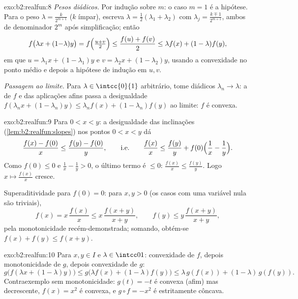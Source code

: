 \begin{solution}{exo:b2:realfun:8}
\emph{Pesos diádicos.} Por indução sobre $m$: o caso $m = 1$ é a
hipótese. Para o peso $\lambda = \frac{k}{2^{m+1}}$ ($k$ ímpar),
escreva $\lambda = \frac12(\lambda_1 + \lambda_2)$ com $\lambda_j =
\frac{k \mp 1}{2^{m+1}}$, ambos de denominador $2^m$ após
simplificação; então
\[
f\bigl(\lambda x + (1{-}\lambda)y\bigr)
= f\Bigl(\tfrac{u + v}{2}\Bigr)
\leq \frac{f(u) + f(v)}{2}
\leq \lambda f(x) + (1 - \lambda) f(y),
\]
em que $u = \lambda_1 x + (1 - \lambda_1)y$ e $v = \lambda_2 x +
(1-\lambda_2)y$, usando a convexidade no ponto médio e depois a hipótese
de indução em $u, v$.

\emph{Passagem ao limite.} Para $\lambda \in
\intcc{0}{1}$ arbitrário, tome diádicos $\lambda_n \to \lambda$: a  de
$f$ e das aplicações afins passa a desigualdade
$f(\lambda_n x + (1-\lambda_n)y) \leq \lambda_n f(x) +
(1-\lambda_n)f(y)$ ao limite: $f$ é convexa.
\end{solution}

\begin{solution}{exo:b2:realfun:9}
Para $0 < x < y$: a desigualdade das inclinações
(\cref{lem:b2:realfun:slopes}) nos pontos $0 < x < y$ dá
\[
\frac{f(x) - f(0)}{x} \leq \frac{f(y) - f(0)}{y},
\qquad\text{i.e.}\qquad
\frac{f(x)}{x} \leq \frac{f(y)}{y} +
f(0)\Bigl(\frac1x - \frac1y\Bigr).
\]
Como $f(0) \leq 0$ e $\frac1x - \frac1y > 0$, o último termo é
$\leq 0$: $\frac{f(x)}{x} \leq \frac{f(y)}{y}$. Logo $x \mapsto
\frac{f(x)}x$ cresce.

Superaditividade para $f(0) = 0$: para $x, y > 0$ (os casos com uma
variável nula são triviais),
\[
f(x) = x\,\frac{f(x)}{x} \leq x\,\frac{f(x+y)}{x+y},
\qquad
f(y) \leq y\,\frac{f(x+y)}{x+y},
\]
pela monotonicidade recém-demonstrada; somando, obtém-se $f(x) + f(y) \leq
f(x+y)$.
\end{solution}

\begin{solution}{exo:b2:realfun:10}
Para $x, y \in I$ e $\lambda \in \intcc01$: convexidade de $f$,
depois monotonicidade de $g$, depois convexidade de $g$:
\[
g\bigl(f(\lambda x + (1{-}\lambda)y)\bigr)
\leq g\bigl(\lambda f(x) + (1{-}\lambda)f(y)\bigr)
\leq \lambda\,g(f(x)) + (1{-}\lambda)\,g(f(y)).
\]
Contraexemplo sem monotonicidade: $g(t) = -t$ é convexa
(afim) mas decrescente, $f(x) = x^2$ é convexa, e $g \circ f =
-x^2$ é estritamente côncava.
\end{solution}

